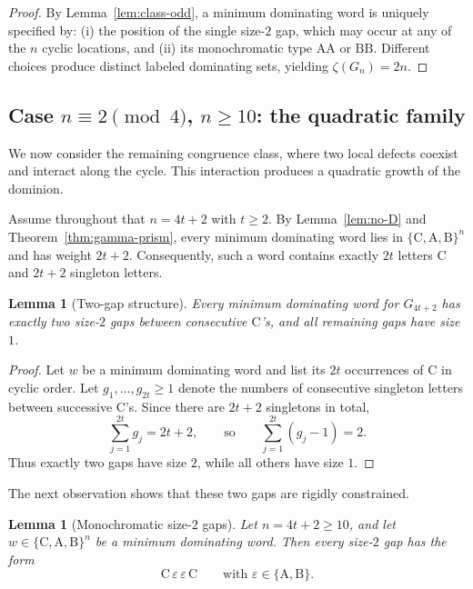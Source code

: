 \documentclass[11pt]{article}
\theoremstyle{plain}
\newtheorem{lemma}[theorem]{Lemma}
\theoremstyle{definition}
\theoremstyle{remark}
\newcommand{\colA}{\mathrm{A}}
\newcommand{\colB}{\mathrm{B}}
\newcommand{\colC}{\mathrm{C}}
\begin{document}
\begin{proof}
By Lemma~\ref{lem:class-odd}, a minimum dominating word is uniquely specified by:
(i) the position of the single size-$2$ gap, which may occur at any of the $n$ cyclic
locations, and (ii) its monochromatic type $\colA\colA$ or $\colB\colB$.
Different choices produce distinct labeled dominating sets, yielding $\zeta(G_n)=2n$.
\end{proof}

\subsection{Case $n\equiv 2\pmod4$, $n\ge10$: the quadratic family}\label{subsec:mod2}

We now consider the remaining congruence class, where two local defects coexist and
interact along the cycle.  This interaction produces a quadratic growth of the dominion.

Assume throughout that $n=4t+2$ with $t\ge2$.  By Lemma~\ref{lem:no-D} and
Theorem~\ref{thm:gamma-prism}, every minimum dominating word lies in
$\{\colC,\colA,\colB\}^n$ and has weight $2t+2$.  Consequently, such a word contains
exactly $2t$ letters $\colC$ and $2t+2$ singleton letters.

\begin{lemma}[Two-gap structure]\label{lem:mod2-two-gap}
Every minimum dominating word for $G_{4t+2}$ has exactly two size-$2$ gaps between
consecutive $\colC$'s, and all remaining gaps have size $1$.
\end{lemma}

\begin{proof}
Let $w$ be a minimum dominating word and list its $2t$ occurrences of $\colC$ in cyclic
order.  Let $g_1,\dots,g_{2t}\ge1$ denote the numbers of consecutive singleton letters
between successive $\colC$'s.  Since there are $2t+2$ singletons in total,
\[
\sum_{j=1}^{2t} g_j = 2t+2,
\qquad\text{so}\qquad
\sum_{j=1}^{2t}(g_j-1)=2.
\]
Thus exactly two gaps have size $2$, while all others have size $1$.
\end{proof}

The next observation shows that these two gaps are rigidly constrained.

\begin{lemma}[Monochromatic size-$2$ gaps]\label{lem:mod2-gap-mono}
Let $n=4t+2\ge10$, and let $w\in\{\colC,\colA,\colB\}^n$ be a minimum dominating word.
Then every size-$2$ gap has the form
\[
\colC\,\varepsilon\,\varepsilon\,\colC
\qquad\text{with }\varepsilon\in\{\colA,\colB\}.
\]
\end{lemma}
\end{document}
